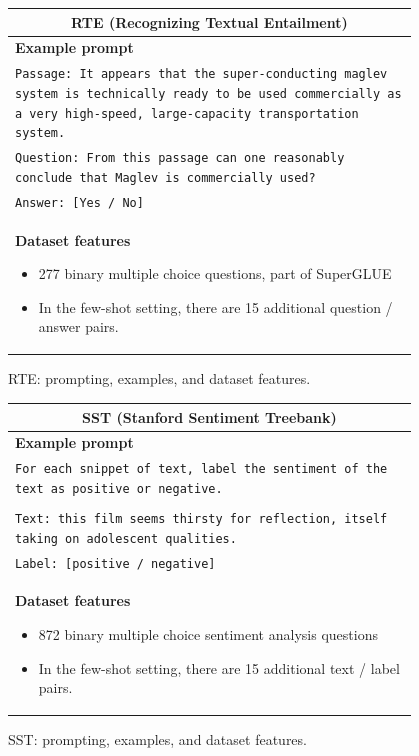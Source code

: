 \documentclass{article}
\begin{document}
\begin{figure}[p]
    \centering \small
    \begin{tabular}{p{0.95\linewidth}}
    \toprule
    \multicolumn{1}{c}{\textbf{RTE (Recognizing Textual Entailment)}} \\

    \midrule
    \textbf{Example prompt}  \\
    \texttt{Passage: It appears that the super-conducting maglev system is technically ready to be used commercially as a very high-speed, large-capacity transportation system.} \\
    \texttt{Question: From this passage can one reasonably conclude that Maglev is commercially used?} \\
    \texttt{Answer: [Yes / No]} \\

    \midrule
    \textbf{Dataset features}
    \begin{itemize}
        \item 277 binary multiple choice questions, part of SuperGLUE
        \item In the few-shot setting, there are 15 additional question / answer pairs.
    \end{itemize} \\

    \bottomrule
    \end{tabular}
    \caption{RTE: prompting, examples, and dataset features.}
    \label{tab:prompt-rte}
\end{figure}

\begin{figure}[p]
    \centering \small
    \begin{tabular}{p{0.95\linewidth}}
    \toprule
    \multicolumn{1}{c}{\textbf{SST (Stanford Sentiment Treebank)}} \\

    \midrule
    \textbf{Example prompt}  \\
    \texttt{For each snippet of text, label the sentiment of the text as positive or negative.} \\\\
    \texttt{Text: this film seems thirsty for reflection, itself taking on adolescent qualities.} \\
    \texttt{Label: [positive / negative]} \\

    \midrule
    \textbf{Dataset features}
    \begin{itemize}
        \item 872 binary multiple choice sentiment analysis questions
        \item In the few-shot setting, there are 15 additional text / label pairs.
    \end{itemize} \\

    \bottomrule
    \end{tabular}
    \caption{SST: prompting, examples, and dataset features.}
    \label{tab:prompt-sst}
\end{figure}
\end{document}
